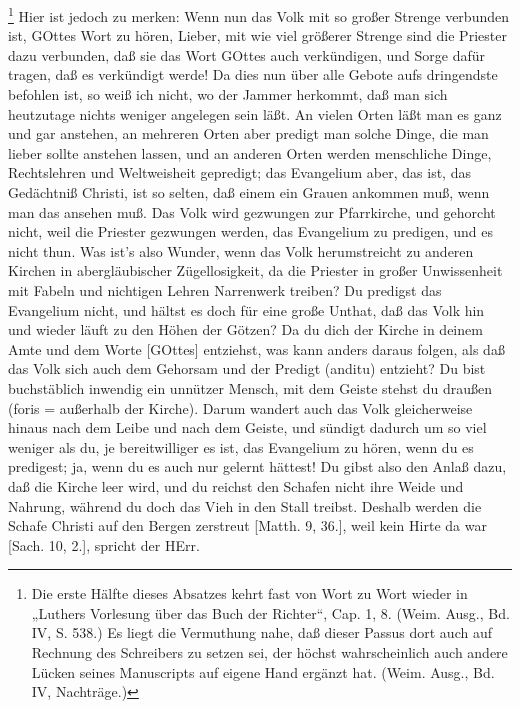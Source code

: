 \footnote{Die erste Hälfte dieses Absatzes kehrt fast von Wort zu Wort wieder in „Luthers Vorlesung über das Buch der Richter“, Cap. 1, 8. (Weim. Ausg., Bd. IV, S. 538.) Es liegt die Vermuthung nahe, daß dieser Passus dort auch auf Rechnung des Schreibers zu setzen sei, der höchst wahrscheinlich auch andere Lücken seines Manuscripts auf eigene Hand ergänzt hat. (Weim. Ausg., Bd. IV, Nachträge.)} Hier ist jedoch zu merken: Wenn nun das Volk mit so großer Strenge verbunden ist, GOttes Wort zu hören, Lieber, mit wie viel größerer Strenge sind die Priester dazu verbunden, daß sie das Wort GOttes auch verkündigen, und Sorge dafür tragen, daß es verkündigt werde! Da dies nun über alle Gebote aufs dringendste befohlen ist, so weiß ich nicht, wo der Jammer herkommt, daß man sich heutzutage nichts weniger angelegen sein läßt. An vielen Orten läßt man es ganz und gar anstehen, an mehreren Orten aber predigt man solche Dinge, die man lieber sollte anstehen lassen, und an anderen Orten werden menschliche Dinge, Rechtslehren und Weltweisheit gepredigt; das Evangelium aber, das ist, das Gedächtniß Christi, ist so selten, daß einem ein Grauen ankommen muß, wenn man das ansehen muß. Das Volk wird gezwungen zur Pfarrkirche, und gehorcht nicht, weil die Priester gezwungen werden, das Evangelium zu predigen, und es nicht thun. Was ist’s also Wunder, wenn das Volk herumstreicht zu anderen Kirchen in abergläubischer Zügellosigkeit, da die Priester in großer Unwissenheit mit Fabeln und nichtigen Lehren Narrenwerk treiben? Du predigst das Evangelium nicht, und hältst es doch für eine große Unthat, daß das Volk hin und wieder läuft zu den Höhen der Götzen? Da du dich der Kirche in deinem Amte und dem Worte [GOttes] entziehst, was kann anders daraus folgen, als daß das Volk sich auch dem Gehorsam und der Predigt (anditu) entzieht? Du bist buchstäblich inwendig ein unnützer Mensch, mit dem Geiste stehst du draußen (foris = außerhalb der Kirche). Darum wandert auch das Volk gleicherweise hinaus nach dem Leibe und nach dem Geiste, und sündigt dadurch um so viel weniger als du, je bereitwilliger es ist, das Evangelium zu hören, wenn du es predigest; ja, wenn du es auch nur gelernt hättest! Du gibst also den Anlaß dazu, daß die Kirche leer wird, und du reichst den Schafen nicht ihre Weide und Nahrung, während du doch das Vieh in den Stall treibst. Deshalb werden die Schafe Christi auf den Bergen zerstreut [Matth. 9, 36.], weil kein Hirte da war [Sach. 10, 2.], spricht der HErr.

